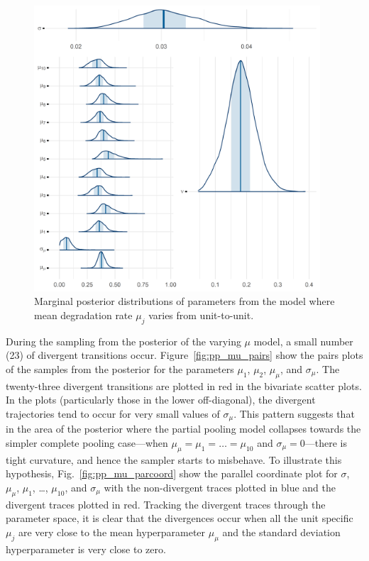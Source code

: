 \begin{figure}
   \centering
   \includegraphics[width=0.95\textwidth]{./figures/ch-5/plot-pp-mu-marg-post-1.png}
   \caption{Marginal posterior distributions of parameters from the model where mean degradation rate $\mu_j$ varies from unit-to-unit.}
   \label{fig:pp_mu_marg} 
\end{figure}

During the sampling from the posterior of the varying $\mu$ model, a small number (23) of divergent transitions occur. Figure~\ref{fig:pp_mu_pairs} show the pairs plots of the samples from the posterior for the parameters $\mu_1$, $\mu_2$, $\mu_\mu$, and $\sigma_\mu$. The twenty-three divergent transitions are plotted in red in the bivariate scatter plots. In the plots (particularly those in the lower off-diagonal), the divergent trajectories tend to occur for very small values of $\sigma_\mu$. This pattern suggests that in the area of the posterior where the partial pooling model collapses towards the simpler complete pooling case---when $\mu_\mu = \mu_1 = \ldots = \mu_{10}$ and $\sigma_\mu = 0$---there is tight curvature, and hence the sampler starts to misbehave. To illustrate this hypothesis, Fig.~\ref{fig:pp_mu_parcoord} show the parallel coordinate plot for $\sigma$, $\mu_\mu$, $\mu_1$, \ldots, $\mu_{10}$, and $\sigma_\mu$ with the non-divergent traces plotted in blue and the divergent traces plotted in red. Tracking the divergent traces through the parameter space, it is clear that the divergences occur when all the unit specific $\mu_j$ are very close to the mean hyperparameter $\mu_\mu$ and the standard deviation hyperparameter is very close to zero.

